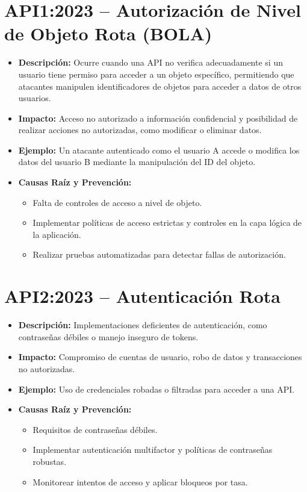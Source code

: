 \documentclass[a4paper,12pt]{article}
\begin{document}
\section{API1:2023 – Autorización de Nivel de Objeto Rota (BOLA)}
\begin{itemize}
    \item \textbf{Descripción:} Ocurre cuando una API no verifica adecuadamente si un usuario tiene permiso para acceder a un objeto específico, permitiendo que atacantes manipulen identificadores de objetos para acceder a datos de otros usuarios.
    \item \textbf{Impacto:} Acceso no autorizado a información confidencial y posibilidad de realizar acciones no autorizadas, como modificar o eliminar datos.
    \item \textbf{Ejemplo:} Un atacante autenticado como el usuario A accede o modifica los datos del usuario B mediante la manipulación del ID del objeto.
    \item \textbf{Causas Raíz y Prevención:}
    \begin{itemize}
        \item Falta de controles de acceso a nivel de objeto.
        \item Implementar políticas de acceso estrictas y controles en la capa lógica de la aplicación.
        \item Realizar pruebas automatizadas para detectar fallas de autorización.
    \end{itemize}
\end{itemize}

\section{API2:2023 – Autenticación Rota}
\begin{itemize}
    \item \textbf{Descripción:} Implementaciones deficientes de autenticación, como contraseñas débiles o manejo inseguro de tokens.
    \item \textbf{Impacto:} Compromiso de cuentas de usuario, robo de datos y transacciones no autorizadas.
    \item \textbf{Ejemplo:} Uso de credenciales robadas o filtradas para acceder a una API.
    \item \textbf{Causas Raíz y Prevención:}
    \begin{itemize}
        \item Requisitos de contraseñas débiles.
        \item Implementar autenticación multifactor y políticas de contraseñas robustas.
        \item Monitorear intentos de acceso y aplicar bloqueos por tasa.
    \end{itemize}
\end{itemize}
\end{document}
